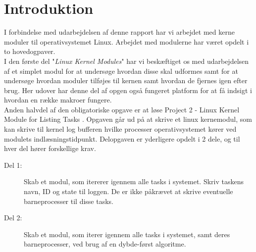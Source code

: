 \documentclass[main.tex]{subfile}
\begin{document}
\section{Introduktion}
I forbindelse med udarbejdelsen af denne rapport har vi arbejdet med kerne moduler til operativsystemet Linux. Arbejdet med modulerne har været opdelt i to hovedogpaver.\\ 

I den første del "\emph{Linux Kernel Modules}" \cite[s.94]{SA:2013} har vi beskæftiget os med udarbejdelsen af et simplet modul for at undersøge hvordan disse skal udformes samt for at undersøge hvordan moduler tilføjes til kernen samt hvordan de fjernes igen efter brug. Her udover har denne del af opgen også fungeret platform for at få indsigt i hvordan en række makroer fungere.\\

Anden halvdel af den obligatoriske opgave er at løse Project 2 - Linux Kernel Module for Listing Tasks \cite[s.156-158]{SA:2013}. Opgaven går ud på at skrive et linux kernemodul, som kan skrive til kernel log bufferen hvilke processer operativsystemet kører ved modulets indlæsningstidpunkt. Delopgaven er yderligere opdelt i 2 dele, og til hver del hører forskellige krav.

\begin{description}
\item[Del 1:] Skab et modul, som itererer igennem alle tasks i systemet. Skriv taskens navn, ID og state til loggen. De er ikke påkrævet at skrive eventuelle barneprocesser til disse tasks.
\item[Del 2:] Skab et modul, som iterer igennem alle tasks i systemet, samt deres barneprocesser, ved brug af en dybde-først algoritme.
\end{description}
\end{document}
